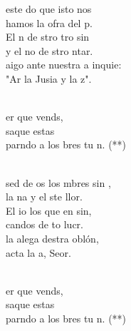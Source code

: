 \documentclass[12pt]{article}
\begin{document}
\begin{multicols*}{2}
\begin{cancion}%
	 este do que isto nos \\
	hamos la ofra del p. \\
	El n de stro tro sin \\
	y el no de stro ntar.\\
	aigo ante nuestra a inquie:\\
	"Ar la Jusia y la z".\\\jump\\
	\begin{chorus}%
	er que vends, \\
	saque estas\\
	parndo a los bres tu n. (**)\\
	\end{chorus}%
	\jump\\
	 sed de os los mbres sin ,\\
	la na y el ste llor. \\
	El io los que en sin,\\
	candos de to lucr.\\
	 la alega destra oblón,\\
	acta la a, Seor.\\\jump\\
	\begin{chorus}%
	er que vends, \\
	saque estas\\
	parndo a los bres tu n. (**)\\
	\end{chorus}%
	\jump\\
\end{cancion}%


\end{multicols*}
\end{document}
